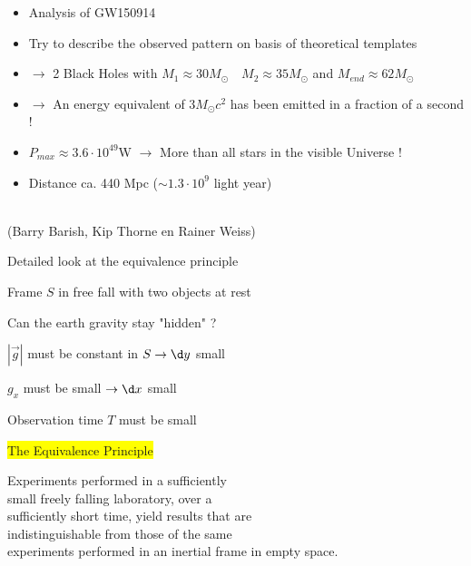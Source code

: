 \Tr
\onecolumn
\begin{itemize}
\item[] \begin{center}{\blue Analysis of GW150914}\end{center}
\item Try to describe the observed pattern on basis of theoretical templates
\item[] $\rightarrow$ 2 Black Holes with $M_{1} \approx 30M_{\odot} \quad M_{2} \approx 35M_{\odot}$ and $M_{end} \approx 62M_{\odot}$
\item[] $\rightarrow$ An energy equivalent of $3M_{\odot}c^{2}$ has been emitted in a fraction of a second !
\item[] $P_{max} \approx 3.6 \cdot 10^{49}$W $\rightarrow$ More than all stars in the visible Universe !
\item Distance ca. 440 Mpc ($\sim 1.3 \cdot 10^{9}$ light year)
\end{itemize}
%
\begin{center}
{\red {}}\\
(Barry Barish, Kip Thorne en Rainer Weiss)
\end{center}

\Tr
{}
\begin{itemize}
\item Detailed look at the equivalence principle
\item[] Frame $S$ in free fall with two objects at rest
\item[$\ast$] {\red Can the earth gravity stay "hidden" ?}
\item[] $|\vec{g}|$ must be constant in $S \rightarrow \d y$ small
\item[] $g_{x}$ must be small $\rightarrow \d x$ small
\item[] Observation time $T$ must be small
\item[] \begin{center}\colorbox{yellow}{The Equivalence Principle}\end{center}
{\red
\item[] Experiments performed in a sufficiently\\
        small freely falling laboratory, over a\\
        sufficiently short time, yield results that are\\
        indistinguishable from those of the same\\
        experiments performed in an inertial frame in empty space.
}
\end{itemize}

